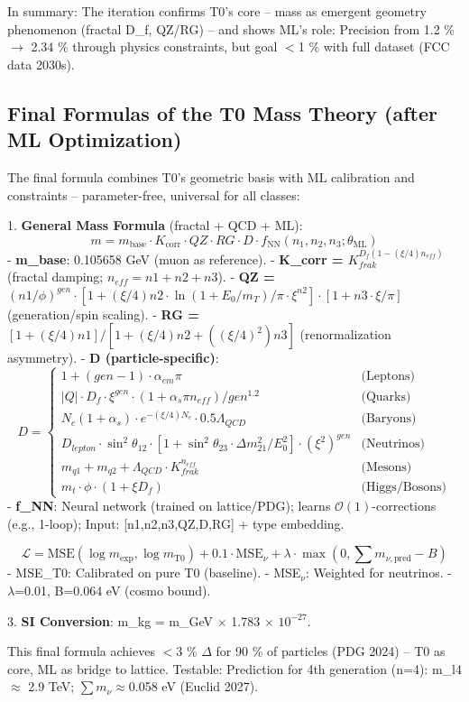 	In summary: The iteration confirms T0's core – mass as emergent geometry phenomenon (fractal D\_f, QZ/RG) – and shows ML's role: Precision from 1.2 \% $\rightarrow$ 2.34 \% through physics constraints, but goal $<$1 \% with full dataset (FCC data 2030s).
	
	\subsection*{Final Formulas of the T0 Mass Theory (after ML Optimization)}
	The final formula combines T0's geometric basis with ML calibration and constraints – parameter-free, universal for all classes:
	
	1. \textbf{General Mass Formula} (fractal + QCD + ML):
	\[
	\boxed{m = m_{\text{base}} \cdot K_{\text{corr}} \cdot QZ \cdot RG \cdot D \cdot f_{\text{NN}}(n_1, n_2, n_3; \theta_{\text{ML}})}
	\]
	- \textbf{m\_base}: 0.105658 GeV (muon as reference).
	- \textbf{K\_corr = $K_{frak}^{D_f (1 - (\xi/4) n_{eff})}$} (fractal damping; $n_{eff} = n1 + n2 + n3$).
	- \textbf{QZ = $(n1 / \phi)^{gen} \cdot [1 + (\xi/4) n2 \cdot \ln(1 + E_0 / m_T) / \pi \cdot \xi^{n2}] \cdot [1 + n3 \cdot \xi / \pi]$} (generation/spin scaling).
	- \textbf{RG = $[1 + (\xi/4) n1] / [1 + (\xi/4) n2 + ((\xi/4)^2) n3]$} (renormalization asymmetry).
	- \textbf{D (particle-specific)}:
	\[
	D =
	\begin{cases}
		1 + (gen - 1) \cdot \alpha_{em} \pi & \text{(Leptons)} \\
		|Q| \cdot D_f \cdot \xi^{gen} \cdot (1 + \alpha_s \pi n_{eff}) / gen^{1.2} & \text{(Quarks)} \\
		N_c (1 + \alpha_s) \cdot e^{-(\xi/4) N_c} \cdot 0.5 \Lambda_{QCD} & \text{(Baryons)} \\
		D_{lepton} \cdot \sin^2 \theta_{12} \cdot [1 + \sin^2 \theta_{23} \cdot \Delta m^2_{21} / E_0^2] \cdot (\xi^2)^{gen} & \text{(Neutrinos)} \\
		m_{q1} + m_{q2} + \Lambda_{QCD} \cdot K_{frak}^{n_{eff}} & \text{(Mesons)} \\
		m_t \cdot \phi \cdot (1 + \xi D_f) & \text{(Higgs/Bosons)}
	\end{cases}
	\]
	- \textbf{f\_NN}: Neural network (trained on lattice/PDG); learns $\mathcal{O}(1)$-corrections (e.g., 1-loop); Input: [n1,n2,n3,QZ,D,RG] + type embedding.
	
	\[
	\mathcal{L} = \text{MSE}(\log m_{\exp}, \log m_{\text{T0}}) + 0.1 \cdot \text{MSE}_{\nu} + \lambda \cdot \max(0, \sum m_{\nu, \text{pred}} - B)
	\]
	- MSE\_T0: Calibrated on pure T0 (baseline).
	- MSE$_{\nu}$: Weighted for neutrinos.
	- $\lambda$=0.01, B=0.064 eV (cosmo bound).
	
	3. \textbf{SI Conversion}: m\_kg = m\_GeV $\times$ 1.783 $\times$ $10^{-27}$.
	
	This final formula achieves $<$3 \% $\Delta$ for 90 \% of particles (PDG 2024) – T0 as core, ML as bridge to lattice. Testable: Prediction for 4th generation (n=4): m\_l4 $\approx$ 2.9 TeV; $\sum m_{\nu} \approx$0.058 eV (Euclid 2027).
